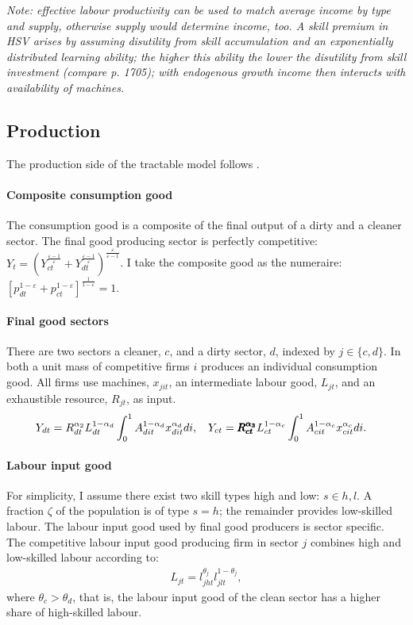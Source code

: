 \textit{Note: effective labour productivity can be used to match average income by type and supply, otherwise supply would determine income, too. A skill premium in HSV arises by assuming disutility from skill accumulation and an exponentially distributed learning ability; the higher this ability the lower the disutility from skill investment (compare p. 1705); with endogenous growth income then interacts with availability of machines. }

\subsection{Production}
The production side of the tractable model follows \cite{Acemoglu2012TheChange}. 
\paragraph{Composite consumption good}
The consumption good is a composite of the final output of a dirty and a cleaner sector. The final good producing sector is perfectly competitive:
$Y_t=\left(Y_{ct}^{\frac{\varepsilon-1}{\varepsilon}}+Y_{dt}^{\frac{\varepsilon-1}{\varepsilon}}\right)^\frac{\varepsilon}{\varepsilon-1}$. 
I take the composite good as the numeraire: $\left[p_{dt}^{1-\varepsilon}+p_{ct}^{1-\varepsilon}\right]^{\frac{1}{1-\varepsilon}}=1$.
\paragraph{Final good sectors}
There are two sectors a cleaner, $c$, and a dirty sector, $d$,  indexed by $j\in\{c,d\}$. In both a unit mass of competitive firms $i$ produces an individual consumption good. All firms use machines, $x_{jit}$, an intermediate labour good, $L_{jt}$, and an exhaustible resource, $R_{jt}$, as input. 
\begin{align*}
&Y_{dt}=R_{dt}^{\alpha_2} L_{dt}^{1-\alpha_d}\int_{0}^{1}A_{dit}^{1-\alpha_d}x_{dit}^{\alpha_d} di,\ \hspace{2mm} Y_{ct}=\pmb{R_{ct}^{\alpha_3}} L_{ct}^{1-\alpha_c}\int_{0}^{1}A_{cit}^{1-\alpha_c}x_{cit}^{\alpha_c} di.
\end{align*}

\paragraph{Labour input good}
For simplicity, I assume there exist two skill types high and low: $s \in {h,l}$. %
A fraction $\zeta$ of the population is of type $s=h$; the remainder provides low-skilled labour. 
The labour input good used by final good producers is sector specific. The competitive labour input good producing firm in sector $j$ combines high and low-skilled labour according to:
\begin{align}
L_{jt}=l_{jht}^{\theta_j}l_{jlt}^{1-\theta_j},
\end{align}
where $\theta_c>\theta_d$, that is, the labour input good of the clean sector has a higher share of high-skilled labour.

